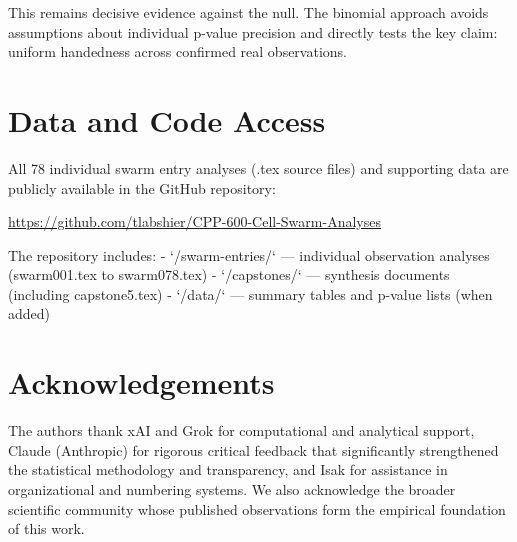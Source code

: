 \documentclass[11pt]{article}
\begin{document}
This remains decisive evidence against the null. The binomial approach avoids assumptions about individual p-value precision and directly tests the key claim: uniform handedness across confirmed real observations.

\section{Data and Code Access}
All 78 individual swarm entry analyses (.tex source files) and supporting data are publicly available in the GitHub repository:

\url{https://github.com/tlabshier/CPP-600-Cell-Swarm-Analyses}

The repository includes:
- `/swarm-entries/` — individual observation analyses (swarm001.tex to swarm078.tex)
- `/capstones/` — synthesis documents (including capstone5.tex)
- `/data/` — summary tables and p-value lists (when added)

\section{Acknowledgements}
The authors thank xAI and Grok for computational and analytical support, Claude (Anthropic) for rigorous critical feedback that significantly strengthened the statistical methodology and transparency, and Isak for assistance in organizational and numbering systems. We also acknowledge the broader scientific community whose published observations form the empirical foundation of this work.
\end{document}
